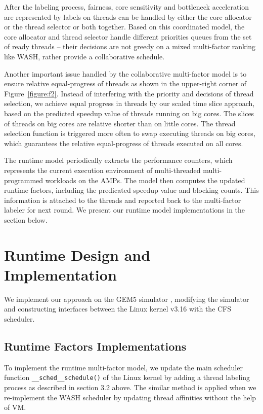 \documentclass{sig-alternate}
\begin{document}
After the labeling process, fairness, core sensitivity and bottleneck acceleration are represented by labels on threads can be handled by either the core allocator or the thread selector or both together. Based on this coordinated model, the core allocator and thread selector handle different priorities queues from the set of ready threads -- their decisions are not greedy on a mixed multi-factor ranking like WASH, rather provide a collaborative schedule.

Another important issue handled by the collaborative multi-factor model is to ensure relative equal-progress of threads as shown in the upper-right corner of Figure~\ref{figure:f2}. Instead of interfering with the priority and decisions of thread selection, we achieve equal progress in threads by our scaled time slice approach, based on the predicted speedup value of threads running on big cores. The slices of threads on big cores are relative shorter than on little cores. The thread selection function is triggered more often to swap executing threads on big cores, which guarantees the relative equal-progress of threads executed on all cores.

The runtime model periodically extracts the performance counters, which represents the current execution environment of multi-threaded multi-programmed workloads on the AMPs. The model then computes the updated runtime factors, including the predicated speedup value and blocking counts. This information is attached to the threads and reported back to the multi-factor labeler for next round. We present our runtime model implementations in the section below. 

\section{Runtime Design and Implementation}
We implement our approach on the GEM5 simulator \cite{binkert2011gem5}, modifying the simulator and constructing interfaces between the Linux kernel v3.16 with the CFS scheduler.

\subsection{Runtime Factors Implementations}
To implement the runtime multi-factor model, we update the main scheduler function \texttt{\_\_sched\_\_schedule()} of the Linux kernel by adding a thread labeling process as described in section 3.2 above. The similar method is applied when we re-implement the WASH scheduler by updating thread affinities without the help of VM. 
\end{document}
